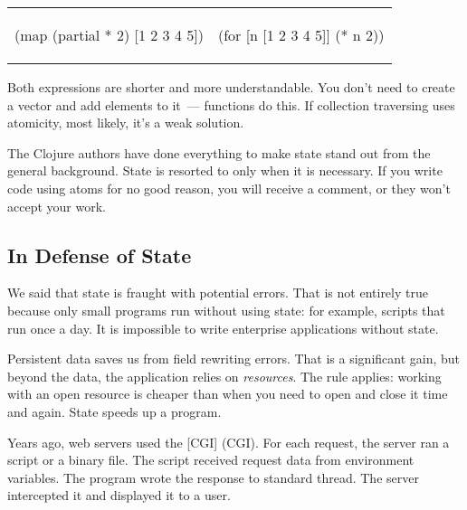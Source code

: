 \else

\begin{english}

\noindent
\begin{tabular}{ @{}p{5cm} @{}p{5cm} }

  \begin{clojure}
(map (partial * 2)
     [1 2 3 4 5])
  \end{clojure}

&

  \begin{clojure}
(for [n [1 2 3 4 5]]
  (* n 2))
  \end{clojure}

\end{tabular}

\end{english}

\fi

Both expressions are shorter and more understandable. You don't need to create a vector and add elements to it~--- functions do this. If collection traversing uses atomicity, most likely, it's a weak solution.

The Clojure authors have done everything to make state stand out from the general background.
State is resorted to only when it is necessary.
If you write code using atoms for no good reason, you will receive a comment, or they won't accept your work.


\subsection{In Defense of State}

We said that state is fraught with potential errors. That is not entirely true because only small programs run without using state: for example, scripts that run once a day. It is impossible to write enterprise applications without state.


Persistent data saves us from field rewriting errors. That is a significant gain, but beyond the data, the application relies on \emph{resources}.
The rule applies: working with an open resource is cheaper than when you need to open and close it time and again.
State speeds up a program.


Years ago, web servers used the [CGI] (CGI).
For each request, the server ran a script or a binary file.
The script received request data from environment variables. The program wrote the response to standard thread. The server intercepted it and displayed it to a user.

